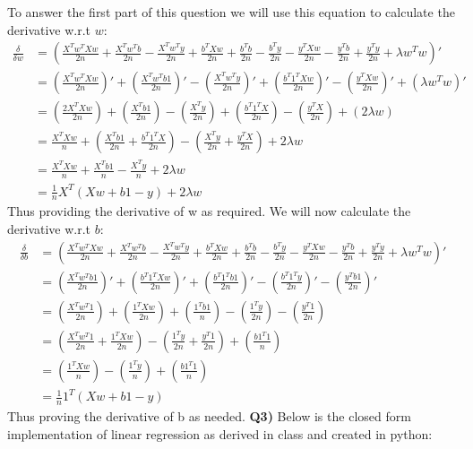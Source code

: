 \documentclass{article}
\begin{document}
\begin{titlepage}
To answer the first part of this question we will use this equation to calculate the derivative w.r.t $w$:
\begin{align*} 
\frac{\delta}{\delta w} &=  \left( \frac{X^Tw^TXw}{2n} + \frac{X^Tw^Tb}{2n} - \frac{X^Tw^Ty}{2n} +  \frac{b^TXw}{2n} + \frac{b^Tb}{2n} - \frac{b^Ty}{2n} -  \frac{y^TXw}{2n} - \frac{y^Tb}{2n} + \frac{y^Ty}{2n} + \lambda w^Tw \right)' \\
&= \left( \frac{X^Tw^TXw}{2n} \right)' + \left( \frac{X^Tw^Tb1}{2n} \right)' -\left( \frac{X^Tw^Ty}{2n} \right)' + \left( \frac{b^T1^TXw}{2n} \right)' - \left( \frac{y^TXw}{2n} \right)' + \left( \lambda w^Tw \right)' \\
&= \left( \frac{2X^TXw}{2n} \right) + \left( \frac{X^Tb1}{2n} \right) -\left( \frac{X^Ty}{2n} \right) + \left( \frac{b^T1^TX}{2n} \right) - \left( \frac{y^TX}{2n} \right) + \left( 2\lambda w \right) \\
&= \frac{X^TXw}{n} + \left( \frac{X^Tb1}{2n} + \frac{b^T1^TX}{2n} \right) - \left( \frac{X^Ty}{2n} + \frac{y^TX}{2n} \right) +2\lambda w \\
&= \frac{X^TXw}{n} + \frac{X^Tb1}{n} - \frac{X^Ty}{n} +2\lambda w \\
&= \frac{1}{n}X^T \left(Xw + b1 - y  \right)+ 2\lambda w
\end{align*}
Thus providing the derivative of w as required. We will now calculate the derivative w.r.t $b$:
\begin{align*} 
\frac{\delta}{\delta b} &=  \left( \frac{X^Tw^TXw}{2n} + \frac{X^Tw^Tb}{2n} - \frac{X^Tw^Ty}{2n} +  \frac{b^TXw}{2n} + \frac{b^Tb}{2n} - \frac{b^Ty}{2n} -  \frac{y^TXw}{2n} - \frac{y^Tb}{2n} + \frac{y^Ty}{2n} + \lambda w^Tw \right)' \\
&=  \left( \frac{X^Tw^Tb1}{2n} \right)' + \left( \frac{b^T1^TXw}{2n} \right)' + \left( \frac{b^T1^Tb1}{2n} \right)' - \left( \frac{b^T1^Ty}{2n} \right)' - \left( \frac{y^Tb1}{2n} \right)' \\
&=  \left( \frac{X^Tw^T1}{2n} \right) + \left( \frac{1^TXw}{2n} \right) + \left( \frac{1^Tb1}{n} \right) - \left( \frac{1^Ty}{2n} \right) - \left( \frac{y^T1}{2n} \right) \\
&= \left( \frac{X^Tw^T1}{2n} + \frac{1^TXw}{2n} \right) - \left( \frac{1^Ty}{2n} + \frac{y^T1}{2n} \right) + \left( \frac{b1^T1}{n} \right) \\
&= \left( \frac{1^TXw}{n} \right) - \left( \frac{1^Ty}{n} \right) + \left( \frac{b1^T1}{n} \right) \\
&= \frac{1}{n}1^T \left(Xw + b1 - y  \right)
\end{align*}
Thus proving the derivative of b as needed.
\newpage
\textbf{Q3)} Below is the closed form implementation of linear regression as derived in class and created in python:


\end{titlepage}
\end{document}
